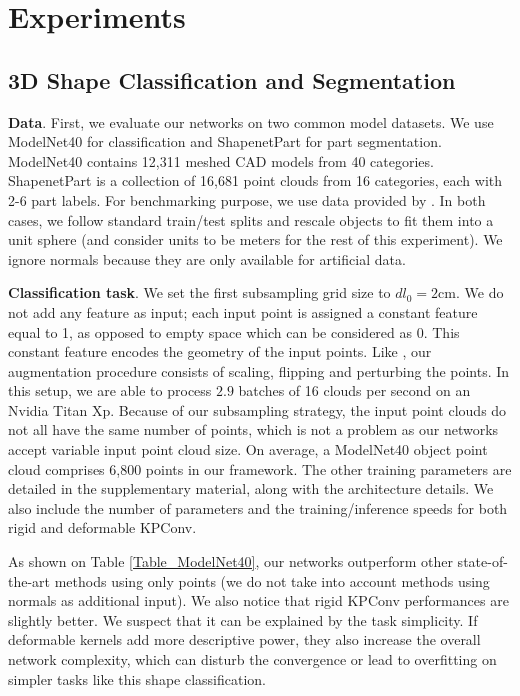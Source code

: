 \documentclass[10pt,twocolumn,letterpaper]{article}
\begin{document}
\section{Experiments}

\subsection{3D Shape Classification and Segmentation}

\noindent
\textbf{Data}. First, we evaluate our networks on two common model datasets. We use ModelNet40 \cite{wu20153d} for classification and ShapenetPart \cite{yi2016scalable} for part segmentation. ModelNet40 contains 12,311 meshed CAD models from 40 categories. ShapenetPart is a collection of 16,681 point clouds from 16 categories, each with 2-6 part labels. For benchmarking purpose, we use data provided by \cite{qi2017pointnet++}. In both cases, we follow standard train/test splits and rescale objects to fit them into a unit sphere (and consider units to be meters for the rest of this experiment). We ignore normals because they are only available for artificial data.

\noindent
\textbf{Classification task}. We set the first subsampling grid size to ${dl}_0=2\mathrm{cm}$. We do not add any feature as input; each input point is assigned a constant feature equal to 1, as opposed to empty space which can be considered as 0. This constant feature encodes the geometry of the input points. Like \cite{atzmon2018point}, our augmentation procedure consists of scaling, flipping and perturbing the points. In this setup, we are able to process $2.9$ batches of 16 clouds per second on an Nvidia Titan Xp. Because of our subsampling strategy, the input point clouds do not all have the same number of points, which is not a problem as our networks accept variable input point cloud size. On average, a ModelNet40 object point cloud comprises 6,800 points in our framework. The other training parameters are detailed in the supplementary material, along with the architecture details. We also include the number of parameters and the training/inference speeds for both rigid and deformable KPConv.

As shown on Table \ref{Table_ModelNet40}, our networks outperform other state-of-the-art methods using only points (we do not take into account methods using normals as additional input). We also notice that rigid KPConv performances are slightly better. We suspect that it can be explained by the task simplicity. If deformable kernels add more descriptive power, they also increase the overall network complexity, which can disturb the convergence or lead to overfitting on simpler tasks like this shape classification. 
\end{document}
